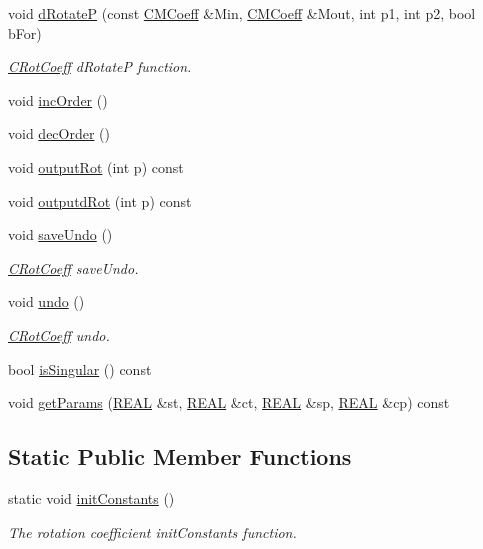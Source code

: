 \begin{DoxyCompactItemize}
void \hyperlink{classCRotCoeff_a88d3ed40239b588e18399c549509f687}{d\-Rotate\-P} (const \hyperlink{classCMCoeff}{C\-M\-Coeff} \&Min, \hyperlink{classCMCoeff}{C\-M\-Coeff} \&Mout, int p1, int p2, bool b\-For)
\begin{DoxyCompactList}\small\item\em \hyperlink{classCRotCoeff}{C\-Rot\-Coeff} d\-Rotate\-P function. \end{DoxyCompactList}\item 
void \hyperlink{classCRotCoeff_a1416603a77ab7c9b7af515a7bad684f1}{inc\-Order} ()
\item 
void \hyperlink{classCRotCoeff_ae9fa83e941510deeda3aac1b8aecc58b}{dec\-Order} ()
\item 
void \hyperlink{classCRotCoeff_a505db8551887fabe49b0f7b6076c2060}{output\-Rot} (int p) const 
\item 
void \hyperlink{classCRotCoeff_a23dff497ccb1ca53dba01af9a27fdab8}{outputd\-Rot} (int p) const 
\item 
void \hyperlink{classCRotCoeff_acf2c3650570013fee7e54491fa1d5920}{save\-Undo} ()
\begin{DoxyCompactList}\small\item\em \hyperlink{classCRotCoeff}{C\-Rot\-Coeff} save\-Undo. \end{DoxyCompactList}\item 
void \hyperlink{classCRotCoeff_a976ea6ff504912701f549e988fd217dc}{undo} ()
\begin{DoxyCompactList}\small\item\em \hyperlink{classCRotCoeff}{C\-Rot\-Coeff} undo. \end{DoxyCompactList}\item 
bool \hyperlink{classCRotCoeff_a4668070c3eacacf17be98bc2fb348287}{is\-Singular} () const 
\item 
void \hyperlink{classCRotCoeff_a27b0198e460737ea20601fa4f0667df5}{get\-Params} (\hyperlink{util_8h_a5821460e95a0800cf9f24c38915cbbde}{R\-E\-A\-L} \&st, \hyperlink{util_8h_a5821460e95a0800cf9f24c38915cbbde}{R\-E\-A\-L} \&ct, \hyperlink{util_8h_a5821460e95a0800cf9f24c38915cbbde}{R\-E\-A\-L} \&sp, \hyperlink{util_8h_a5821460e95a0800cf9f24c38915cbbde}{R\-E\-A\-L} \&cp) const 
\end{DoxyCompactItemize}
\subsection*{Static Public Member Functions}
\begin{DoxyCompactItemize}
\item 
static void \hyperlink{classCRotCoeff_aa51371c84f373916cd8e35031b38cb52}{init\-Constants} ()
\begin{DoxyCompactList}\small\item\em The rotation coefficient init\-Constants function. \end{DoxyCompactList}\end{DoxyCompactItemize}



